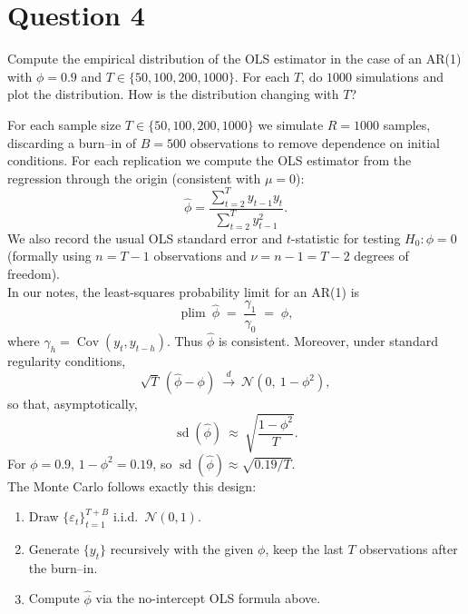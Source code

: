 \documentclass[dvipsnames,11pt]{article}
\begin{document}
\section*{Question 4}
\setcounter{section}{4}

    Compute the empirical distribution of the OLS estimator in the case of an AR(1) with $\phi=0.9$ and $T\in\{50,100,200,1000\}$. For each $T$, do $1000$ simulations and plot the distribution. How is the distribution changing with $T$?

    \begin{solution}

        For each sample size $T\in\{50,100,200,1000\}$ we simulate $R=1000$ samples, discarding a burn–in of $B=500$ observations to remove dependence on initial conditions. For each replication we compute the OLS estimator from the regression through the origin (consistent with $\mu=0$):
        \[
        \widehat\phi=\frac{\sum_{t=2}^{T} y_{t-1}y_t}{\sum_{t=2}^{T} y_{t-1}^2}.
        \]
        We also record the usual OLS standard error and $t$-statistic for testing $H_0:\phi=0$ (formally using $n=T-1$ observations and $\nu=n-1=T-2$ degrees of freedom). \\

        In our notes, the least-squares probability limit for an AR(1) is
        \[
        \operatorname*{plim}\ \widehat\phi \;=\; \frac{\gamma_1}{\gamma_0}\;=\;\phi,
        \]
        where $\gamma_h=\operatorname{Cov}(y_t,y_{t-h})$. Thus $\widehat\phi$ is consistent. Moreover, under standard regularity conditions,
        \[
        \sqrt{T}\,(\widehat\phi-\phi)\ \xrightarrow{d}\ \mathcal{N}\!\left(0,\ 1-\phi^2\right),
        \]
        so that, asymptotically,
        \[
        \operatorname{sd}(\widehat\phi)\ \approx\ \sqrt{\frac{1-\phi^2}{T}}.
        \]
        For $\phi=0.9$, $1-\phi^2=0.19$, so $\operatorname{sd}(\widehat\phi)\approx \sqrt{0.19/T}$. \\

        The Monte Carlo follows exactly this design:
        
        \begin{enumerate}
            \item Draw $\{\varepsilon_t\}_{t=1}^{T+B}$ i.i.d.\ $\mathcal{N}(0,1)$.
          
            \item Generate $\{y_t\}$ recursively with the given $\phi$, keep the last $T$ observations after the burn–in.
          
            \item Compute $\widehat\phi$ via the no-intercept OLS formula above.
          

\end{enumerate}
\end{solution}
\end{document}
